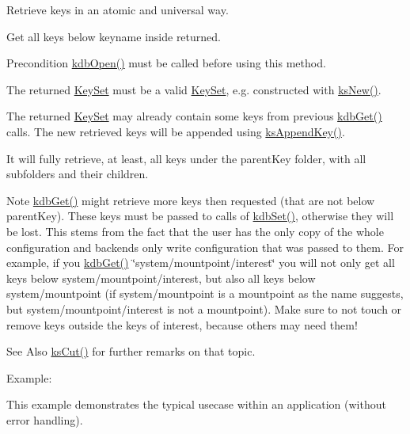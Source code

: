 Retrieve keys in an atomic and universal way.  

Get all keys below keyname inside returned.

\begin{DoxyPrecond}{Precondition}
\hyperlink{group__kdb_ga6808defe5870f328dd17910aacbdc6ca}{kdb\-Open()} must be called before using this method.

The {\ttfamily returned} \hyperlink{classkdb_1_1KeySet}{Key\-Set} must be a valid \hyperlink{classkdb_1_1KeySet}{Key\-Set}, e.\-g. constructed with \hyperlink{group__keyset_ga671e1aaee3ae9dc13b4834a4ddbd2c3c}{ks\-New()}.
\end{DoxyPrecond}
The {\ttfamily returned} \hyperlink{classkdb_1_1KeySet}{Key\-Set} may already contain some keys from previous \hyperlink{group__kdb_ga28e385fd9cb7ccfe0b2f1ed2f62453a1}{kdb\-Get()} calls. The new retrieved keys will be appended using \hyperlink{group__keyset_gaa5a1d467a4d71041edce68ea7748ce45}{ks\-Append\-Key()}.

It will fully retrieve, at least, all keys under the {\ttfamily parent\-Key} folder, with all subfolders and their children.

\begin{DoxyNote}{Note}
\hyperlink{group__kdb_ga28e385fd9cb7ccfe0b2f1ed2f62453a1}{kdb\-Get()} might retrieve more keys then requested (that are not below parent\-Key). These keys must be passed to calls of \hyperlink{group__kdb_ga11436b058408f83d303ca5e996832bcf}{kdb\-Set()}, otherwise they will be lost. This stems from the fact that the user has the only copy of the whole configuration and backends only write configuration that was passed to them. For example, if you \hyperlink{group__kdb_ga28e385fd9cb7ccfe0b2f1ed2f62453a1}{kdb\-Get()} \char`\"{}system/mountpoint/interest\char`\"{} you will not only get all keys below system/mountpoint/interest, but also all keys below system/mountpoint (if system/mountpoint is a mountpoint as the name suggests, but system/mountpoint/interest is not a mountpoint). Make sure to not touch or remove keys outside the keys of interest, because others may need them!
\end{DoxyNote}
\begin{DoxySeeAlso}{See Also}
\hyperlink{group__keyset_ga6b00cf82b59af4d883a9bad6cf4a4a4a}{ks\-Cut()} for further remarks on that topic.
\end{DoxySeeAlso}
\begin{DoxyParagraph}{Example\-:}

\end{DoxyParagraph}
This example demonstrates the typical usecase within an application (without error handling).


